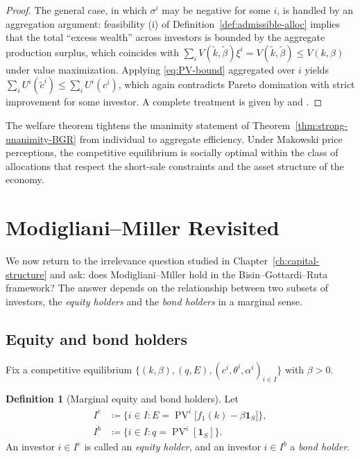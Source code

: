 \documentclass[11pt,a4paper,oneside]{book}
\def\1{\mathbf{1}}
\def\leq{\leqslant}
\DeclareMathOperator{\PV}{PV}
\theoremstyle{plain}
\theoremstyle{definition}
\newtheorem{definition}[theorem]{Definition}
\theoremstyle{remark}
\numberwithin{equation}{chapter}
\begin{document}
\begin{proof}
The general case, in which $\sigma^i$ may be negative for some $i$, is handled by an aggregation argument: feasibility (i) of Definition~\ref{def:admissible-alloc} implies that the total ``excess wealth'' across investors is bounded by the aggregate production surplus, which coincides with $\sum_i V(\widetilde{k}, \widetilde{\beta}) \xi^i = V(\widetilde{k}, \widetilde{\beta}) \leq V(k, \beta)$ under value maximization.
Applying \eqref{eq:PV-bound} aggregated over $i$ yields $\sum_i U^i(\widetilde{c}^i) \leq \sum_i U^i(c^i)$, which again contradicts Pareto domination with strict improvement for some investor.
A complete treatment is given by \citet{BisinGottardiRuta2015} and \citet{Makowski1980}.
\end{proof}

The welfare theorem tightens the unanimity statement of Theorem~\ref{thm:strong-unanimity-BGR} from individual to aggregate efficiency.
Under Makowski price perceptions, the competitive equilibrium is socially optimal within the class of allocations that respect the short-sale constraints and the asset structure of the economy.

\section{Modigliani--Miller Revisited}
\label{sec:MM-BGR}

We now return to the irrelevance question studied in Chapter~\ref{ch:capital-structure} and ask: does Modigliani--Miller hold in the Bisin--Gottardi--Ruta framework?
The answer depends on the relationship between two subsets of investors, the \emph{equity holders} and the \emph{bond holders} in a marginal sense.

\subsection{Equity and bond holders}

Fix a competitive equilibrium $\bigl\{ (k, \beta), (q, E), (c^i, \theta^i, \alpha^i)_{i \in I} \bigr\}$ with $\beta > 0$.

\begin{definition}[Marginal equity and bond holders]\label{def:marginal-holders}
Let
\begin{align*}
  I^e &\coloneqq \bigl\{ i \in I \colon E = \PV^i\bigl[ f_1(k) - \beta \1_S \bigr] \bigr\}, \\
  I^b &\coloneqq \bigl\{ i \in I \colon q = \PV^i[\1_S] \bigr\}.
\end{align*}
An investor $i \in I^e$ is called an \emph{equity holder}, and an investor $i \in I^b$ a \emph{bond holder}.
\end{definition}
\end{document}
